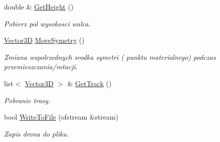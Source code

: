 \begin{DoxyCompactItemize}
double \& \hyperlink{class_quadracopter_aa8bc9fd45eb2b63505ae29673a9e157d}{Get\+Height} ()
\begin{DoxyCompactList}\small\item\em Pobierz pol wysokosci walca. \end{DoxyCompactList}\item 
\hyperlink{vector3_d_8hh_a8790ef07836c1639da216f46501979c0}{Vector3D} \hyperlink{class_quadracopter_aa1c2a6f507a5bcd7bc37fa5d44a930e5}{Move\+Symetry} ()
\begin{DoxyCompactList}\small\item\em Zmiana wspolrzednych srodka symetri ( punktu materialnego) podczas przemieszczania/rotacji. \end{DoxyCompactList}\item 
list$<$ \hyperlink{vector3_d_8hh_a8790ef07836c1639da216f46501979c0}{Vector3D} $>$ \& \hyperlink{class_quadracopter_a8b7c6b9d441156f3991b11b73543adc3}{Get\+Track} ()
\begin{DoxyCompactList}\small\item\em Pobranie trasy. \end{DoxyCompactList}\item 
bool \hyperlink{class_quadracopter_a0653c1a4019907005c4d758168ad2ec1}{Write\+To\+File} (ofstream \&stream)
\begin{DoxyCompactList}\small\item\em Zapis drona do pliku. \end{DoxyCompactList}\end{DoxyCompactItemize}
